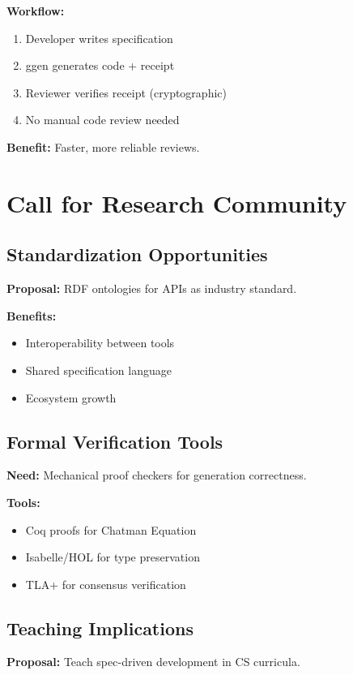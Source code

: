 \textbf{Workflow:}
\begin{enumerate}
    \item Developer writes specification
    \item ggen generates code + receipt
    \item Reviewer verifies receipt (cryptographic)
    \item No manual code review needed
\end{enumerate}

\textbf{Benefit:} Faster, more reliable reviews.

\section{Call for Research Community}

\subsection{Standardization Opportunities}

\textbf{Proposal:} RDF ontologies for APIs as industry standard.

\textbf{Benefits:}
\begin{itemize}
    \item Interoperability between tools
    \item Shared specification language
    \item Ecosystem growth
\end{itemize}

\subsection{Formal Verification Tools}

\textbf{Need:} Mechanical proof checkers for generation correctness.

\textbf{Tools:}
\begin{itemize}
    \item Coq proofs for Chatman Equation
    \item Isabelle/HOL for type preservation
    \item TLA+ for consensus verification
\end{itemize}

\subsection{Teaching Implications}

\textbf{Proposal:} Teach spec-driven development in CS curricula.

